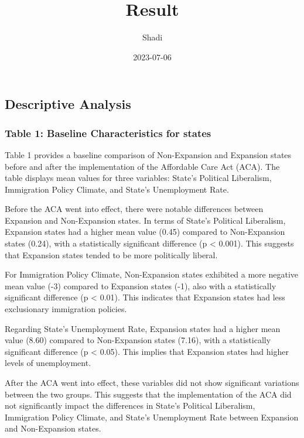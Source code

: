 \documentclass[
]{article}
\title{Result}
\author{Shadi}
\date{2023-07-06}
\begin{document}
\maketitle

\hypertarget{descriptive-analysis}{%
\subsection{Descriptive Analysis}\label{descriptive-analysis}}

\hypertarget{table-1-baseline-characteristics-for-states}{%
\subsubsection{Table 1: Baseline Characteristics for
states}\label{table-1-baseline-characteristics-for-states}}

Table 1 provides a baseline comparison of Non-Expansion and Expansion
states before and after the implementation of the Affordable Care Act
(ACA). The table displays mean values for three variables: State's
Political Liberalism, Immigration Policy Climate, and State's
Unemployment Rate.

Before the ACA went into effect, there were notable differences between
Expansion and Non-Expansion states. In terms of State's Political
Liberalism, Expansion states had a higher mean value (0.45) compared to
Non-Expansion states (0.24), with a statistically significant difference
(p \textless{} 0.001). This suggests that Expansion states tended to be
more politically liberal.

For Immigration Policy Climate, Non-Expansion states exhibited a more
negative mean value (-3) compared to Expansion states (-1), also with a
statistically significant difference (p \textless{} 0.01). This
indicates that Expansion states had less exclusionary immigration
policies.

Regarding State's Unemployment Rate, Expansion states had a higher mean
value (8.60) compared to Non-Expansion states (7.16), with a
statistically significant difference (p \textless{} 0.05). This implies
that Expansion states had higher levels of unemployment.

After the ACA went into effect, these variables did not show significant
variations between the two groups. This suggests that the implementation
of the ACA did not significantly impact the differences in State's
Political Liberalism, Immigration Policy Climate, and State's
Unemployment Rate between Expansion and Non-Expansion states.
\end{document}
